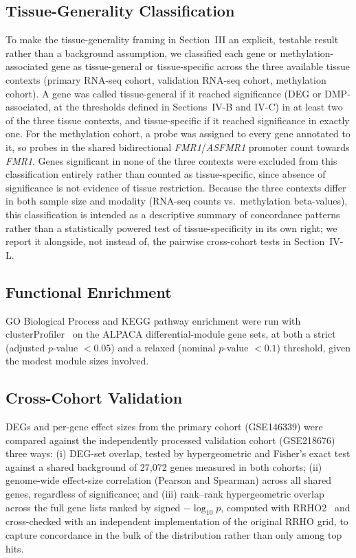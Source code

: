 \documentclass[journal]{IEEEtran}
\newcommand{\gene}[1]{\textit{#1}}
\begin{document}
\subsection{Tissue-Generality Classification}
To make the tissue-generality framing in Section~III an explicit, testable result rather than a background assumption, we classified each gene or methylation-associated gene as tissue-general or tissue-specific across the three available tissue contexts (primary RNA-seq cohort, validation RNA-seq cohort, methylation cohort). A gene was called tissue-general if it reached significance (DEG or DMP-associated, at the thresholds defined in Sections~IV-B and IV-C) in at least two of the three tissue contexts, and tissue-specific if it reached significance in exactly one. For the methylation cohort, a probe was assigned to every gene annotated to it, so probes in the shared bidirectional \gene{FMR1}/\gene{ASFMR1} promoter count towards \gene{FMR1}. Genes significant in none of the three contexts were excluded from this classification entirely rather than counted as tissue-specific, since absence of significance is not evidence of tissue restriction. Because the three contexts differ in both sample size and modality (RNA-seq counts vs.\ methylation beta-values), this classification is intended as a descriptive summary of concordance patterns rather than a statistically powered test of tissue-specificity in its own right; we report it alongside, not instead of, the pairwise cross-cohort tests in Section~IV-L.

\subsection{Functional Enrichment}
GO Biological Process and KEGG pathway enrichment were run with clusterProfiler~\cite{clusterprofiler} on the ALPACA differential-module gene sets, at both a strict (adjusted $p$-value $<0.05$) and a relaxed (nominal $p$-value $<0.1$) threshold, given the modest module sizes involved.

\subsection{Cross-Cohort Validation}
DEGs and per-gene effect sizes from the primary cohort (GSE146339) were compared against the independently processed validation cohort (GSE218676) three ways: (i) DEG-set overlap, tested by hypergeometric and Fisher's exact test against a shared background of 27,072 genes measured in both cohorts; (ii) genome-wide effect-size correlation (Pearson and Spearman) across all shared genes, regardless of significance; and (iii) rank--rank hypergeometric overlap~\cite{rrho} across the full gene lists ranked by signed $-\log_{10}p$, computed with RRHO2~\cite{rrho2} and cross-checked with an independent implementation of the original RRHO grid, to capture concordance in the bulk of the distribution rather than only among top hits.
\end{document}
